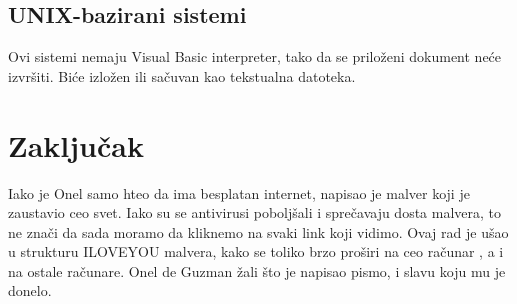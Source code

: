 \documentclass[a4paper]{article}
\begin{document}
\subsection{UNIX-bazirani sistemi}
Ovi sistemi nemaju Visual Basic interpreter, tako da se priloženi dokument neće izvršiti. Biće izložen ili sačuvan kao tekstualna datoteka.

\section{Zaključak}
\label{sec:zakljucak}

Iako je Onel samo hteo da ima besplatan internet, napisao je malver koji je zaustavio ceo svet. Iako su se antivirusi poboljšali
i sprečavaju dosta malvera, to ne znači da sada moramo da kliknemo na svaki link koji vidimo. Ovaj rad je ušao u strukturu ILOVEYOU malvera, kako se toliko brzo proširi na ceo računar
, a i na ostale računare. Onel de Guzman žali što je napisao pismo, i slavu koju mu je donelo.

\pagebreak
{}
\appendix

 

\end{document}
